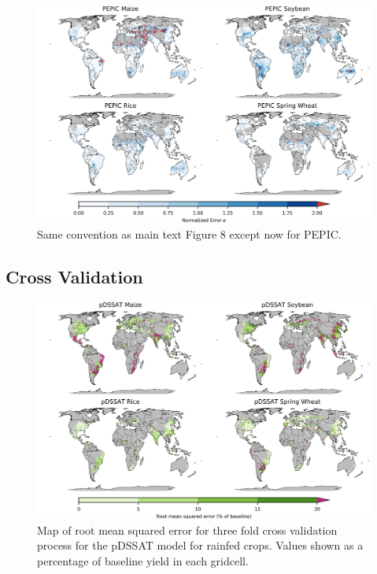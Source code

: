 \documentclass[10pt]{article}
\begin{document}
\begin{figure}[h!]
\centering
\includegraphics[width=15.5cm]{PEPIC_spatial_error.png}
\caption{Same convention as main text Figure 8 except now for PEPIC.}
\label{fig:lpjmlnorm}
\end{figure}

\clearpage
\subsection{Cross Validation}

\begin{figure}[h!]
\centering
\includegraphics[width=15.5cm]{pDSSAT_spatial_MSE_ton_ha.png}
\caption{Map of root mean squared error for three fold cross validation process for the pDSSAT model for rainfed crops. Values shown as a percentage of baseline yield in each gridcell.}
\label{fig:pdssatrmse}
\end{figure}
\end{document}
